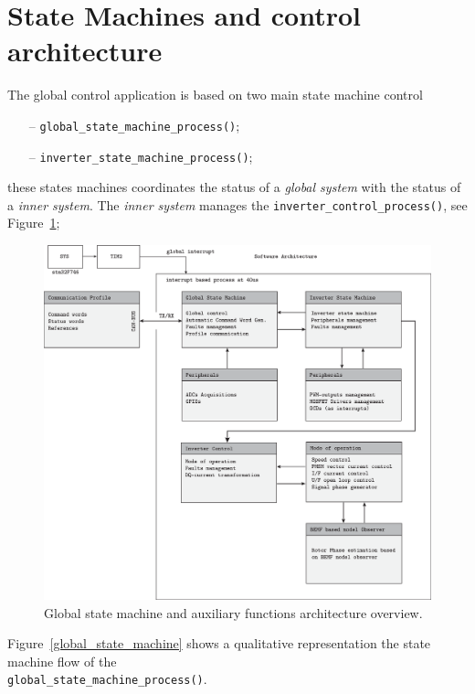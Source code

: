 \documentclass[11pt,a4paper,oneside]{book}
\numberwithin{equation}{section}
\theoremstyle{it}
\theoremstyle{definition}
\begin{document}
\section{State Machines and control architecture}
The global control application is based on two main state machine control 
\begin{itemize}
	\item[--] {\selectfont \verb+global_state_machine_process()+};
	\item[--] {\selectfont \verb+inverter_state_machine_process()+};
\end{itemize}
these states machines coordinates the status of a \textit{global system} with the status of a \textit{inner system}. The \textit{inner system} manages the {\selectfont \verb+inverter_control_process()+}, see Figure~\ref{software_architecture}; 
\begin{figure}[H]
	\centering
	\includegraphics[width = 475pt, angle = 0, 
	keepaspectratio]{figures/firmware_arch/software_architecture_2.eps}
	\captionsetup{width=0.5\textwidth, font=small}	
	\caption{Global state machine and auxiliary functions architecture overview.}
	\label{software_architecture}
\end{figure}
Figure~\ref{global_state_machine} shows a qualitative representation the state machine flow of the \\ {\selectfont \verb+global_state_machine_process()+}.
\end{document}
